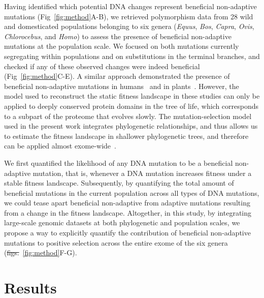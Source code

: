 \documentclass[10pt,letterpaper]{article}
\providecommand{\DIFaddtex}[1]{{\protect\color{blue}\uwave{#1}}} %
\providecommand{\DIFdeltex}[1]{{\protect\color{red}\sout{#1}}}                      %
\providecommand{\DIFaddbegin}{} %
\providecommand{\DIFaddend}{} %
\providecommand{\DIFdelbegin}{} %
\providecommand{\DIFdelend}{} %
\providecommand{\DIFadd}[1]{\texorpdfstring{\DIFaddtex{#1}}{#1}} %
\providecommand{\DIFdel}[1]{\texorpdfstring{\DIFdeltex{#1}}{}} %
\newcommand{\DIFscaledelfig}{0.5}
\newlength{\DIFdelgraphicswidth} %
\newlength{\DIFdelgraphicsheight} %
\newcommand{\DIFaddincludegraphics}[2][]{{\color{blue}\fbox{\DIFOincludegraphics[#1]{#2}}}} %
\newcommand{\DIFdelincludegraphics}[2][]{%
\sbox{\DIFdelgraphicsbox}{\DIFOincludegraphics[#1]{#2}}%
\settoboxwidth{\DIFdelgraphicswidth}{\DIFdelgraphicsbox} %
\settoboxtotalheight{\DIFdelgraphicsheight}{\DIFdelgraphicsbox} %
\scalebox{\DIFscaledelfig}{%
\parbox[b]{\DIFdelgraphicswidth}{\usebox{\DIFdelgraphicsbox}\\[-\baselineskip] \rule{\DIFdelgraphicswidth}{0em}}\llap{\resizebox{\DIFdelgraphicswidth}{\DIFdelgraphicsheight}{%
\setlength{\unitlength}{\DIFdelgraphicswidth}%
\begin{picture}(1,1)%
\thicklines\linethickness{2pt} %
{\color[rgb]{1,0,0}\put(0,0){\framebox(1,1){}}}%
{\color[rgb]{1,0,0}\put(0,0){\line( 1,1){1}}}%
{\color[rgb]{1,0,0}\put(0,1){\line(1,-1){1}}}%
\end{picture}%
}\hspace*{3pt}}} %
} %
\DeclareRobustCommand{\DIFaddbegin}{\DIFOaddbegin \let\includegraphics\DIFaddincludegraphics} %
\DeclareRobustCommand{\DIFaddend}{\DIFOaddend \let\includegraphics\DIFOincludegraphics} %
\DeclareRobustCommand{\DIFdelbegin}{\DIFOdelbegin \let\includegraphics\DIFdelincludegraphics} %
\DeclareRobustCommand{\DIFdelend}{\DIFOaddend \let\includegraphics\DIFOincludegraphics} %
\begin{document}
Having identified which potential DNA changes represent beneficial non-adaptive mutations (Fig~\ref{fig:method}A-B), we retrieved polymorphism data from 28 wild and domesticated populations belonging to six genera (\textit{Equus}, \textit{Bos}, \textit{Capra}, \textit{Ovis}, \textit{Chlorocebus}, and \textit{Homo}) to assess the presence of beneficial non-adaptive mutations at the population scale.
We focused on both mutations currently segregating within populations and on substitutions in the terminal branches, and checked if any of these observed changes were indeed beneficial (Fig~\ref{fig:method}C-E).
A similar approach demonstrated the presence of beneficial non-adaptive mutations in humans~\cite{moses_inferring_2009, fischer_germline_2011} and in plants~\cite{chen_hunting_2021}.
However, the model used to reconstruct the static fitness landscape in these studies can only be applied to deeply conserved protein domains in the tree of life, which corresponds to a subpart of the proteome that evolves slowly.
The mutation-selection model used in the present work integrates phylogenetic relationships, and thus allows us to estimate the fitness landscape in shallower phylogenetic trees, and therefore can be applied almost exome-wide~\cite{rodrigue_mutationselection_2010}.

We first quantified the likelihood of any DNA mutation to be a beneficial non-adaptive mutation, that is, whenever a DNA mutation increases fitness under a stable fitness landscape.
Subsequently, by quantifying the total amount of beneficial mutations in the current population across all types of DNA mutations, we could tease apart beneficial non-adaptive from adaptive mutations resulting from a change in the fitness landscape.
Altogether, in this study, by integrating large-scale genomic datasets at both phylogenetic and population scales, we propose a way to explicitly quantify the contribution of beneficial non-adaptive mutations to positive selection across the entire exome of the six genera (\DIFdelbegin \DIFdel{figs.}\DIFdelend \DIFaddbegin \DIFadd{Fig}\DIFaddend ~\ref{fig:method}F-G).

\section*{Results}
\end{document}
